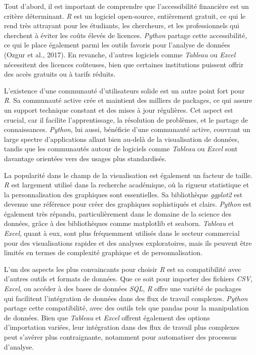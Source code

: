 \documentclass[
  letterpaper,
  DIV=11,
  numbers=noendperiod]{scrreprt}
\begin{document}
Tout d'abord, il est important de comprendre que l'accessibilité
financière est un critère déterminant. \emph{R} est un logiciel
open-source, entièrement gratuit, ce qui le rend très attrayant pour les
étudiants, les chercheurs, et les professionnels qui cherchent à éviter
les coûts élevés de licences. \emph{Python} partage cette accessibilité,
ce qui le place également parmi les outils favoris pour l'analyse de
données (Ozgur et al., 2017). En revanche, d'autres logiciels comme
\emph{Tableau} ou \emph{Excel} nécessitent des licences coûteuses, bien
que certaines institutions puissent offrir des accès gratuits ou à
tarifs réduits.

L'existence d'une communauté d'utilisateurs solide est un autre point
fort pour \emph{R}. Sa communauté active crée et maintient des milliers
de packages, ce qui assure un support technique constant et des mises à
jour régulières. Cet aspect est crucial, car il facilite
l'apprentissage, la résolution de problèmes, et le partage de
connaissances. \emph{Python}, lui aussi, bénéficie d'une communauté
active, couvrant un large spectre d'applications allant bien au-delà de
la visualisation de données, tandis que les communautés autour de
logiciels comme \emph{Tableau} ou \emph{Excel} sont davantage orientées
vers des usages plus standardisés.

La popularité dans le champ de la visualisation est également un facteur
de taille. \emph{R} est largement utilisé dans la recherche académique,
où la rigueur statistique et la personnalisation des graphiques sont
essentielles. Sa bibliothèque \emph{ggplot2} est devenue une référence
pour créer des graphiques sophistiqués et clairs. \emph{Python} est
également très répandu, particulièrement dans le domaine de la science
des données, grâce à des bibliothèques comme matplotlib et seaborn.
\emph{Tableau} et \emph{Excel}, quant à eux, sont plus fréquemment
utilisés dans le secteur commercial pour des visualisations rapides et
des analyses exploratoires, mais ils peuvent être limités en termes de
complexité graphique et de personnalisation.

L'un des aspects les plus convaincants pour choisir \emph{R} est sa
compatibilité avec d'autres outils et formats de données. Que ce soit
pour importer des fichiers \emph{CSV}, \emph{Excel}, ou accéder à des
bases de données \emph{SQL}, \emph{R} offre une variété de packages qui
facilitent l'intégration de données dans des flux de travail complexes.
\emph{Python} partage cette compatibilité, avec des outils tels que
pandas pour la manipulation de données. Bien que \emph{Tableau} et
\emph{Excel} offrent également des options d'importation variées, leur
intégration dans des flux de travail plus complexes peut s'avérer plus
contraignante, notamment pour automatiser des processus d'analyse.
\end{document}
